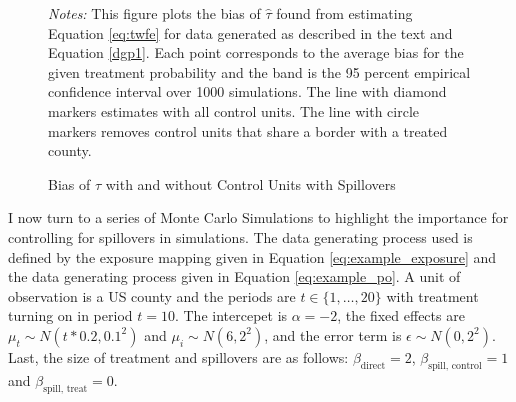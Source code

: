 \documentclass[11pt]{article}
\begin{document}
\begin{figure}[t!]
    \caption{Bias of $\hat{\tau}$ with and without Control Units with Spillovers}
    \label{fig:bias_as_treat_prob}
    {\centering
    }

    {\footnotesize
        \textit{Notes:} This figure plots the bias of $\hat{\tau}$ found from estimating Equation \ref{eq:twfe} for data generated as described in the text and Equation \ref{dgp1}. Each point corresponds to the average bias for the given treatment probability and the band is the 95 percent empirical confidence interval over 1000 simulations. The line with diamond markers estimates with all control units. The line with circle markers removes control units that share a border with a treated county. 
    }
\end{figure}

I now turn to a series of Monte Carlo Simulations to highlight the importance for controlling for spillovers in simulations. The data generating process used is defined by the exposure mapping given in Equation \ref{eq:example_exposure} and the data generating process given in Equation \ref{eq:example_po}. A unit of observation is a US county and the periods are $t \in \{1, \dots, 20\}$ with treatment turning on in period $t = 10$. The intercepet is $\alpha = -2$, the fixed effects are $\mu_t \sim N(t * 0.2, 0.1^2)$ and $\mu_i \sim N(6, 2^2)$, and the error term is $\epsilon \sim N(0, 2^2)$. Last, the size of treatment and spillovers are as follows: $\beta_{\text{direct}} = 2$, $\beta_{\text{spill, control}} = 1$ and $\beta_{\text{spill, treat}} = 0$.
\end{document}
